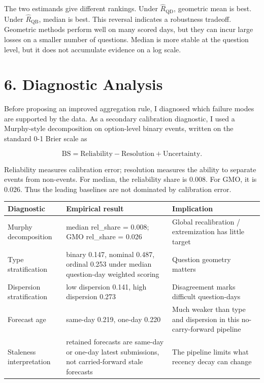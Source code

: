 \documentclass[
]{article}
\newcounter{none} %
\begin{document}
The two estimands give different rankings. Under
\(\widehat R_{\mathrm{QD}}\), geometric mean is best. Under
\(\widehat R_{\mathrm{QB}}\), median is best. This reversal indicates a
robustness tradeoff. Geometric methods perform well on many scored days,
but they can incur large losses on a smaller number of questions. Median
is more stable at the question level, but it does not accumulate
evidence on a log scale.

\section{6. Diagnostic Analysis}\label{diagnostic-analysis}

Before proposing an improved aggregation rule, I diagnosed which failure
modes are supported by the data. As a secondary calibration diagnostic,
I used a Murphy-style decomposition on option-level binary events,
written on the standard 0-1 Brier scale as

\[
\mathrm{BS}=\mathrm{Reliability}-\mathrm{Resolution}+\mathrm{Uncertainty}.
\]

Reliability measures calibration error; resolution measures the ability
to separate events from non-events. For median, the reliability share is
0.008. For GMO, it is 0.026. Thus the leading baselines are not
dominated by calibration error.

{\def\LTcaptype{none} %
\begin{longtable}[]{@{}
  >{\raggedright\arraybackslash}p{}
  >{\raggedright\arraybackslash}p{}
  >{\raggedright\arraybackslash}p{}@{}}
\toprule\noalign{}
\begin{minipage}[b]{\linewidth}\raggedright
Diagnostic
\end{minipage} & \begin{minipage}[b]{\linewidth}\raggedright
Empirical result
\end{minipage} & \begin{minipage}[b]{\linewidth}\raggedright
Implication
\end{minipage} \\
\midrule\noalign{}
\endhead
\bottomrule\noalign{}
\endlastfoot
Murphy decomposition & median rel\_share = 0.008; GMO rel\_share = 0.026
& Global recalibration / extremization has little target \\
Type stratification & binary 0.147, nominal 0.487, ordinal 0.253 under
median question-day weighted scoring & Question geometry matters \\
Dispersion stratification & low dispersion 0.141, high dispersion 0.273
& Disagreement marks difficult question-days \\
Forecast age & same-day 0.219, one-day 0.220 & Much weaker than type and
dispersion in this no-carry-forward pipeline \\
Staleness interpretation & retained forecasts are same-day or one-day
latest submissions, not carried-forward stale forecasts & The pipeline
limits what recency decay can change \\
\end{longtable}
}
\end{document}
